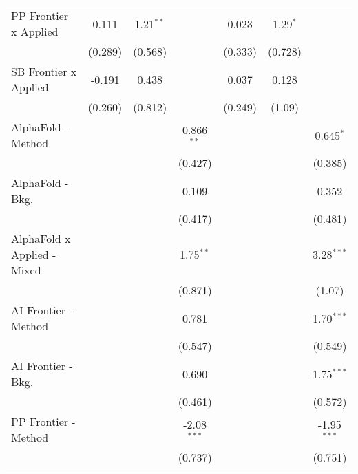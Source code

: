 \begin{tabular}{lcccccc}
   PP Frontier x Applied          & 0.111         & 1.21$^{**}$  &               & 0.023         & 1.29$^{*}$  &   \\   
                                  & (0.289)       & (0.568)      &               & (0.333)       & (0.728)     &   \\   
   SB Frontier x Applied          & -0.191        & 0.438        &               & 0.037         & 0.128       &   \\   
                                  & (0.260)       & (0.812)      &               & (0.249)       & (1.09)      &   \\   
   AlphaFold - Method             &               &              & 0.866$^{**}$  &               &             & 0.645$^{*}$\\   
                                  &               &              & (0.427)       &               &             & (0.385)\\   
   AlphaFold - Bkg.               &               &              & 0.109         &               &             & 0.352\\   
                                  &               &              & (0.417)       &               &             & (0.481)\\   
   AlphaFold x Applied - Mixed    &               &              & 1.75$^{**}$   &               &             & 3.28$^{***}$\\   
                                  &               &              & (0.871)       &               &             & (1.07)\\   
   AI Frontier - Method           &               &              & 0.781         &               &             & 1.70$^{***}$\\   
                                  &               &              & (0.547)       &               &             & (0.549)\\   
   AI Frontier - Bkg.             &               &              & 0.690         &               &             & 1.75$^{***}$\\   
                                  &               &              & (0.461)       &               &             & (0.572)\\   
   PP Frontier - Method           &               &              & -2.08$^{***}$ &               &             & -1.95$^{***}$\\   
                                  &               &              & (0.737)       &               &             & (0.751)\\   

\end{tabular}
